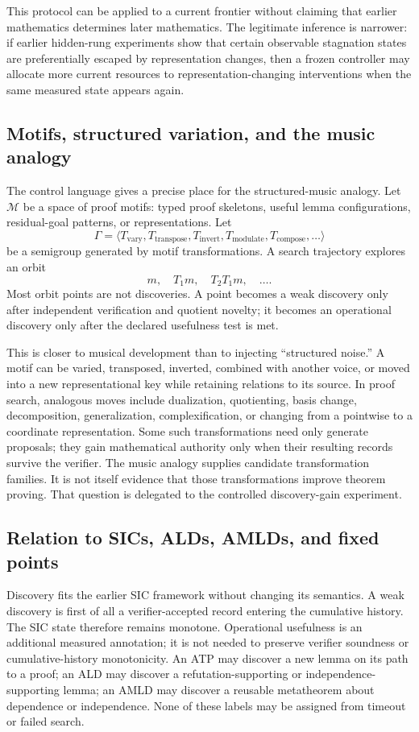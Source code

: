 This protocol can be applied to a current frontier without claiming that earlier mathematics determines later mathematics. The legitimate inference is narrower: if earlier hidden-rung experiments show that certain observable stagnation states are preferentially escaped by representation changes, then a frozen controller may allocate more current resources to representation-changing interventions when the same measured state appears again.

\subsection{Motifs, structured variation, and the music analogy}
The control language gives a precise place for the structured-music analogy. Let $\mathcal M$ be a space of proof motifs: typed proof skeletons, useful lemma configurations, residual-goal patterns, or representations. Let
\[
\Gamma=\langle T_{\mathrm{vary}},T_{\mathrm{transpose}},T_{\mathrm{invert}},T_{\mathrm{modulate}},T_{\mathrm{compose}},\ldots\rangle
\]
be a semigroup generated by motif transformations. A search trajectory explores an orbit
\[
m,\quad T_1m,\quad T_2T_1m,\quad\ldots .
\]
Most orbit points are not discoveries. A point becomes a weak discovery only after independent verification and quotient novelty; it becomes an operational discovery only after the declared usefulness test is met.

This is closer to musical development than to injecting ``structured noise.'' A motif can be varied, transposed, inverted, combined with another voice, or moved into a new representational key while retaining relations to its source. In proof search, analogous moves include dualization, quotienting, basis change, decomposition, generalization, complexification, or changing from a pointwise to a coordinate representation. Some such transformations need only generate proposals; they gain mathematical authority only when their resulting records survive the verifier. The music analogy supplies candidate transformation families. It is not itself evidence that those transformations improve theorem proving. That question is delegated to the controlled discovery-gain experiment.

\subsection{Relation to SICs, ALDs, AMLDs, and fixed points}
Discovery fits the earlier SIC framework without changing its semantics. A weak discovery is first of all a verifier-accepted record entering the cumulative history. The SIC state therefore remains monotone. Operational usefulness is an additional measured annotation; it is not needed to preserve verifier soundness or cumulative-history monotonicity. An ATP may discover a new lemma on its path to a proof; an ALD may discover a refutation-supporting or independence-supporting lemma; an AMLD may discover a reusable metatheorem about dependence or independence. None of these labels may be assigned from timeout or failed search.

